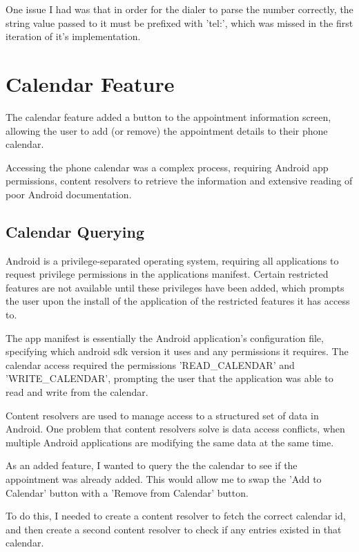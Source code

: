 One issue I had was that in order for the dialer to parse the number correctly, the string value passed to it must be prefixed with 'tel:', which was missed in the first iteration of it's implementation.

\section{Calendar Feature}

The calendar feature added a button to the appointment information screen, allowing the user to add (or remove) the appointment details to their phone calendar.

Accessing the phone calendar was a complex process, requiring Android app permissions, content resolvers to retrieve the information and extensive reading of poor Android documentation.

\subsection{Calendar Querying}

Android is a privilege-separated operating system, requiring all applications to request privilege permissions in the applications manifest. Certain restricted features are not available until these privileges have been added, which prompts the user upon the install of the application of the restricted features it has access to.

The app manifest is essentially the Android application's configuration file, specifying which android sdk version it uses and any permissions it requires. The calendar access required the permissions 'READ\_CALENDAR' and 'WRITE\_CALENDAR', prompting the user that the application was able to read and write from the calendar.

Content resolvers are used to manage access to a structured set of data in Android. One problem that content resolvers solve is data access conflicts, when multiple Android applications are modifying the same data at the same time.

As an added feature, I wanted to query the the calendar to see if the appointment was already added. This would allow me to swap the 'Add to Calendar' button with a 'Remove from Calendar' button.

To do this, I needed to create a content resolver to fetch the correct calendar id, and then create a second content resolver to check if any entries existed in that calendar.

